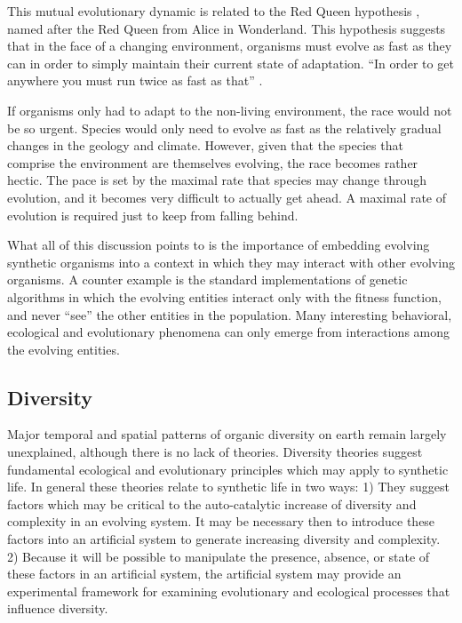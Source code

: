 This mutual evolutionary dynamic is related to the Red Queen
hypothesis \cite{VanV}, named after the Red Queen from Alice in
Wonderland.  This hypothesis suggests that in the face of a
changing environment, organisms must evolve as fast as they can
in order to simply maintain their current state of adaptation.
``In order to get anywhere you must run twice as fast as that''
\cite{Carr}.

If organisms only had to adapt to the non-living environment, the
race would not be so urgent.  Species would only need to evolve as
fast as the relatively gradual changes in the geology and climate.
However, given that the species that comprise the environment are
themselves evolving, the race becomes rather hectic.  The pace is set
by the maximal rate that species may change through evolution, and it
becomes very difficult to actually get ahead.  A maximal rate of evolution
is required just to keep from falling behind.

What all of this discussion points to is the importance of embedding
evolving synthetic organisms into a context in which they may interact
with other evolving organisms.  A counter example is the standard
implementations of genetic algorithms in which the evolving entities
interact only with the fitness function, and never ``see'' the other
entities in the population.  Many interesting behavioral, ecological
and evolutionary phenomena can only emerge from interactions among
the evolving entities.

\subsection{Diversity}

Major temporal and spatial patterns of organic diversity on earth remain
largely unexplained, although there is no lack of theories.  Diversity
theories suggest fundamental ecological and evolutionary principles which
may apply to synthetic life.  In general these theories relate to
synthetic life in two ways:  1) They suggest factors which may be critical
to the auto-catalytic increase of diversity and complexity in an evolving
system.  It may be necessary then to introduce these factors into an
artificial system to generate increasing diversity and complexity.
2) Because it will be possible to manipulate the presence, absence, or
state of these factors in an artificial system, the artificial system may
provide an experimental framework for examining evolutionary and
ecological processes that influence diversity.

